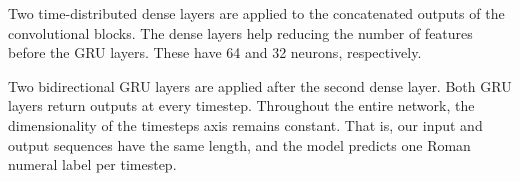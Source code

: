 

Two time-distributed dense layers are applied to the concatenated outputs of the convolutional blocks. The dense layers help reducing the number of features before the GRU layers. These have 64 and 32 neurons, respectively.

Two bidirectional GRU \parencite{cho2014learning} layers are applied after the second dense layer.
Both GRU layers return outputs at every timestep.
Throughout the entire network, the dimensionality of the timesteps axis remains constant. That is, our input and output sequences have the same length, and the model predicts one Roman numeral label per timestep.
